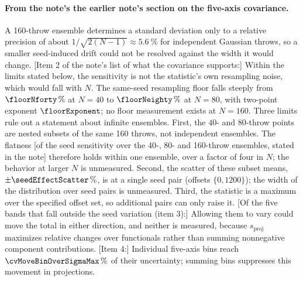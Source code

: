 \paragraph{From the note's the earlier note's section on the five-axis covariance.}
A 160-throw ensemble determines a standard deviation only to a relative precision of about $1/\sqrt{2(N-1)}\approx\SI{5.6}{\percent}$ for independent Gaussian throws, so a smaller seed-induced drift could not be resolved against the width it would change.
[Item 2 of the note's list of what the covariance supports:] Within the limits stated below, the sensitivity is not the statistic's own resampling noise, which would fall with $N$. The same-seed resampling floor falls steeply from $\floorNforty\,\%$ at $N=40$ to $\floorNeighty\,\%$ at $N=80$, with two-point exponent $\floorExponent$; no floor measurement exists at $N=160$. Three limits rule out a statement about infinite ensembles. First, the $40$- and $80$-throw points are nested subsets of the same 160 throws, not independent ensembles. The flatness [of the seed sensitivity over the 40-, 80- and 160-throw ensembles, stated in the note] therefore holds within one ensemble, over a factor of four in $N$; the behavior at larger $N$ is unmeasured. Second, the scatter of these subset means, $\pm\seedEffectScatter\,\%$, is at a single seed pair (offsets $\{0,1200\}$); the width of the distribution over seed pairs is unmeasured. Third, the statistic is a maximum over the specified offset set, so additional pairs can only raise it.
[Of the five bands that fall outside the seed variation (item 3):] Allowing them to vary could move the total in either direction, and neither is measured, because $s_{\mathrm{proj}}$ maximizes relative changes over functionals rather than summing nonnegative component contributions.
[Item 4:] Individual five-axis bins reach $\cvMoveBinOverSigmaMax\,\%$ of their uncertainty; summing bins suppresses this movement in projections.

